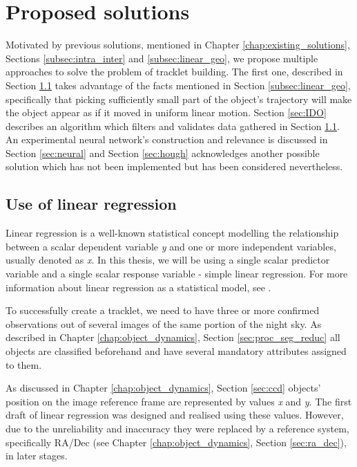 \chapter{Proposed solutions}\label{chap:proposed_solutions}

	Motivated by previous solutions, mentioned in Chapter \ref{chap:existing_solutions}, Sections \ref{subsec:intra_inter} and \ref{subsec:linear_geo}, we propose multiple approaches to solve the problem of tracklet building. The first one, described in Section \ref{sec:linear_regression} takes advantage of the facts mentioned in Section \ref{subsec:linear_geo}, specifically that picking sufficiently small part of the object's trajectory will make the object appear as if it moved in uniform linear motion. Section \ref{sec:IDO} describes an algorithm which filters and validates data gathered in Section \ref{sec:linear_regression}. An experimental neural network's construction and relevance is discussed in Section \ref{sec:neural} and Section \ref{sec:hough} acknowledges another possible solution which has not been implemented but has been considered nevertheless.

\section{Use of linear regression}\label{sec:linear_regression}

	Linear regression is a well-known statistical concept modelling the relationship between a scalar dependent variable \emph{y} and one or more independent variables, usually denoted as \emph{x}. In this thesis, we will be using a single scalar predictor variable and a single scalar response variable - simple linear regression. For more information about linear regression as a statistical model, see \citep{freedman2005statistical}.
	
	To successfully create a tracklet, we need to have three or more confirmed observations out of several images of the same portion of the night sky. As described in Chapter \ref{chap:object_dynamics}, Section \ref{sec:proc_seg_reduc} all objects are classified beforehand and have several mandatory attributes assigned to them.
	
	As discussed in Chapter \ref{chap:object_dynamics}, Section \ref{sec:ccd} objects' position on the image reference frame are represented by values \emph{x} and \emph{y}. The first draft of linear regression was designed and realised using these values. However, due to the unreliability and inaccuracy they were replaced by a reference system, specifically RA/Dec (see Chapter \ref{chap:object_dynamics}, Section \ref{sec:ra_dec}), in later stages.
	
